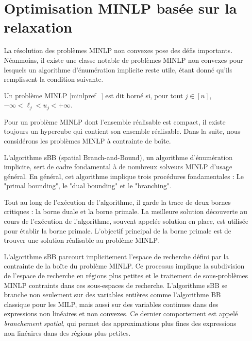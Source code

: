    \section{Optimisation MINLP basée sur la relaxation}

   La résolution des problèmes MINLP non convexes pose des défis importants. Néanmoins, il existe une classe notable de problèmes MINLP non convexes pour lesquels un algorithme d'énumération implicite reste utile, étant donné qu'ils remplissent la condition suivante.
   
   \begin{definition}
       Un problème MINLP \eqref{minlpref_} est dit borné si, pour tout $j \in [n]$, $-\infty < \ell_j < u_j <+\infty$. 
   \end{definition}
   
   Pour un problème MINLP dont l'ensemble réalisable est compact, il existe toujours un hypercube qui contient son ensemble réalisable. Dans la suite, nous considérons les problèmes MINLP à contrainte de boîte. 
   
    L'algorithme sBB (spatial Branch-and-Bound), un algorithme d'énumération implicite, sert de cadre fondamental à de nombreux solveurs MINLP d'usage général. En général, cet algorithme implique trois procédures fondamentales : Le "primal bounding", le "dual bounding" et le "branching".
   
   
   
   Tout au long de l'exécution de l'algorithme, il garde la trace de deux bornes critiques : la borne duale et la borne primale. La meilleure solution découverte au cours de l'exécution de l'algorithme, souvent appelée solution en place, est utilisée pour établir la borne primale. L'objectif principal de la borne primale est de trouver une solution réalisable au problème MINLP.
   
   L'algorithme sBB parcourt implicitement l'espace de recherche défini par la contrainte de la boîte du problème MINLP. Ce processus implique la subdivision de l'espace de recherche en régions plus petites et le traitement de sous-problèmes MINLP contraints dans ces sous-espaces de recherche. L'algorithme sBB se branche non seulement sur des variables entières comme l'algorithme BB classique pour les MILP, mais aussi sur des variables continues dans des expressions non linéaires et non convexes. Ce dernier comportement est appelé \emph{branchement spatial}, qui permet des approximations plus fines des expressions non linéaires dans des régions plus petites.
   

